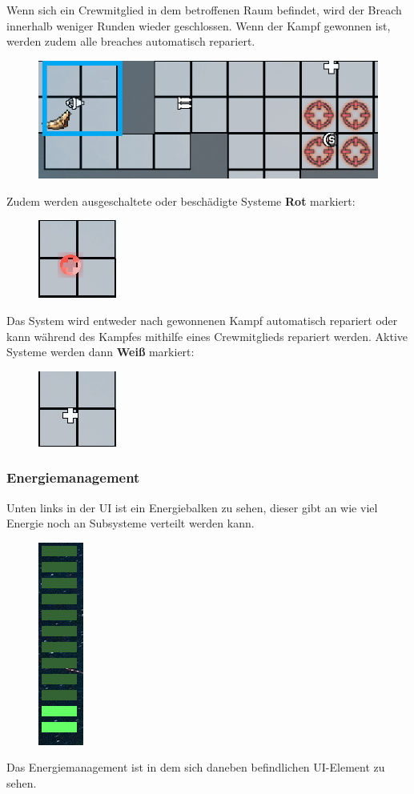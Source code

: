 \documentclass[fontsize=12pt,paper=a4,twoside]{scrartcl}
\begin{document}
Wenn sich ein Crewmitglied in dem betroffenen Raum befindet, wird der Breach innerhalb weniger Runden wieder geschlossen. Wenn der Kampf gewonnen ist, werden zudem alle breaches automatisch repariert.

\begin{figure}[H]
\centering
\includegraphics[width=0.7\linewidth]{DasSpiel/Ui/breach2.png}
\end{figure}

Zudem werden ausgeschaltete oder beschädigte Systeme \textbf{Rot} markiert:

\begin{figure}[H]
\centering
\includegraphics[width=0.2\linewidth]{DasSpiel/Ui/system_off.png}
\end{figure}



Das System wird entweder nach gewonnenen Kampf automatisch repariert oder kann während des Kampfes mithilfe eines Crewmitglieds repariert werden. Aktive Systeme werden dann \textbf{Weiß} markiert:

\begin{figure}[H]
\centering
\includegraphics[width=0.2\linewidth]{DasSpiel/Ui/heal_on2.png}
\end{figure}

\subsubsection{Energiemanagement} \label{sec:Energiemanagement}
Unten links in der UI ist ein Energiebalken zu sehen, dieser gibt an wie viel Energie noch an Subsysteme verteilt werden kann.
\begin{figure}[H]
\centering
\includegraphics[width=0.05\linewidth]{DasSpiel/Ui/power.png}
\end{figure}
Das Energiemanagement ist in dem sich daneben befindlichen UI-Element zu sehen.
\end{document}
